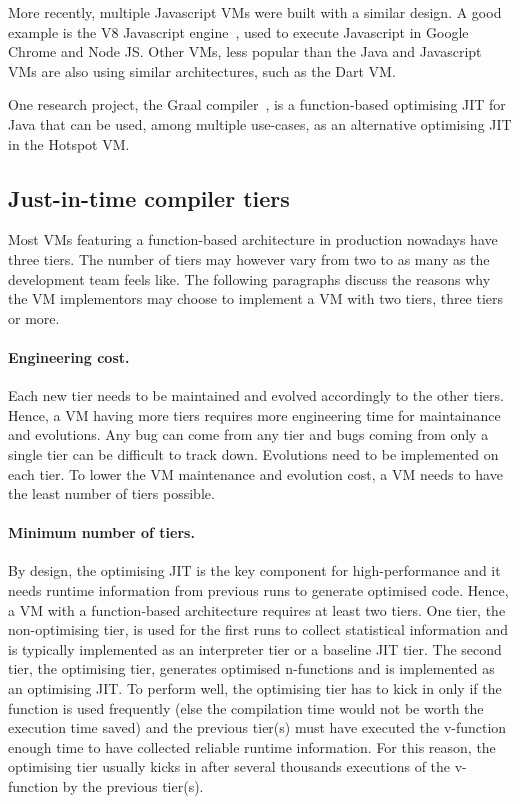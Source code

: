 \documentclass[a4paper,12pt,twoside]{../includes/ThesisStyle}
\begin{document}
More recently, multiple Javascript VMs were built with a similar design. A good example is the V8 Javascript engine~\cite{V8}, used to execute Javascript in Google Chrome and Node JS. Other VMs, less popular than the Java and Javascript VMs are also using similar architectures, such as the Dart VM. 

One research project, the Graal compiler~\cite{Oracle13,Dubo13c}, is a function-based optimising JIT for Java that can be used, among multiple use-cases, as an alternative optimising JIT in the Hotspot VM.

\subsection{Just-in-time compiler tiers}

Most VMs featuring a function-based architecture in production nowadays have three tiers. The number of tiers may however vary from two to as many as the development team feels like. The following paragraphs discuss the reasons why the VM implementors may choose to implement a VM with two tiers, three tiers or more.

\paragraph{Engineering cost.} Each new tier needs to be maintained and evolved accordingly to the other tiers. Hence, a VM having more tiers requires more engineering time for maintainance and evolutions. Any bug can come from any tier and bugs coming from only a single tier can be difficult to track down. Evolutions need to be implemented on each tier. To lower the VM maintenance and evolution cost, a VM needs to have the least number of tiers possible.

\paragraph{Minimum number of tiers.} By design, the optimising JIT is the key component for high-performance and it needs runtime information from previous runs to generate optimised code. Hence, a VM with a function-based architecture requires at least two tiers. One tier, the non-optimising tier, is used for the first runs to collect statistical information and is typically implemented as an interpreter tier or a baseline JIT tier. The second tier, the optimising tier, generates optimised n-functions and is implemented as an optimising JIT. To perform well, the optimising tier has to kick in only if the function is used frequently (else the compilation time would not be worth the execution time saved) and the previous tier(s) must have executed the v-function enough time to have collected reliable runtime information. For this reason, the optimising tier usually kicks in after several thousands executions of the v-function by the previous tier(s).
\end{document}
